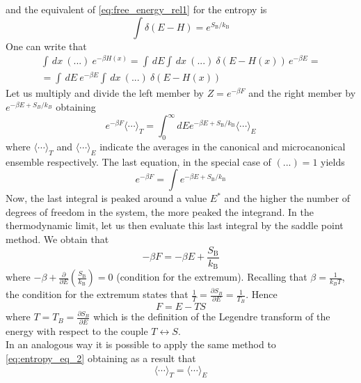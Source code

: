 and the equivalent of \ref{eq:free_energy_rel1} for the entropy is
\begin{equation*}
    \int \delta(E-H) = e^{S_{\mathrm{B}} / k_{\mathrm{B}}}
\end{equation*}
One can write that
\begin{gather*}
    \int \, dx \ (...) \ e^{-\beta H(x)} = \int \, dE \int \, dx \ (...) \ \delta(E-H(x)) \, e^{-\beta E} =  \\
    = \int \, dE \ e^{-\beta E} \int \, dx \ (...) \ \delta(E-H(x))
\end{gather*}
Let us multiply and divide the left member by $Z = e^{-\beta F}$ and the right member by $e^{-\beta E + S_B/k_B}$ obtaining
\begin{equation}
    e^{-\beta F}\langle\cdots\rangle_{T}=\int_{0}^{\infty} d E e^{-\beta E+S_{\mathrm{B}} / k_{\mathrm{B}}}\langle\cdots\rangle_{E}
    \label{eq:entropy_eq_2}
\end{equation}
where $\langle\cdots\rangle_{T}$ and $\langle\cdots\rangle_{E}$ indicate the averages in the canonical and microcanonical ensemble respectively. The last equation, in the special case of $(...) = 1$ yields
\begin{equation*}
    e^{-\beta F} = \int e^{-\beta E+S_{\mathrm{B}} / k_{\mathrm{B}}}
\end{equation*}
Now, the last integral is peaked around a value $E^*$ and the higher the number of degrees of freedom in the system, the more peaked the integrand. In the
thermodynamic limit, let us then evaluate this last integral by the saddle point method. We obtain that 
\begin{equation*}
    -\beta F=-\beta E+\frac{S_{\mathrm{B}}}{k_{\mathrm{B}}}
\end{equation*}
where $-\beta+\frac{\partial}{\partial E}\left(\frac{S_{\mathrm{B}}}{k_{\mathrm{B}}}\right)=0$ (condition for the extremum). Recalling that $\beta=\frac{1}{k_BT}$, the condition for the extremum states that 
$\frac{1}{T} = \frac{\partial S_B}{\partial E} = \frac{1}{T_B}$. Hence
\begin{equation}
    F = E - TS
    \label{eq:free_energy_def}
\end{equation}
where $T = T_B = \frac{\partial S_B}{\partial E}$ which is the definition of the Legendre transform of the energy with respect to the couple $T \leftrightarrow S$. \\
In an analogous way it is possible to apply the same method to \ref{eq:entropy_eq_2} obtaining as a result that 
\begin{equation}
    \langle\cdots\rangle_{T} = \langle\cdots\rangle_{E}
    \label{eq:equivalence_of_averages}
\end{equation}
